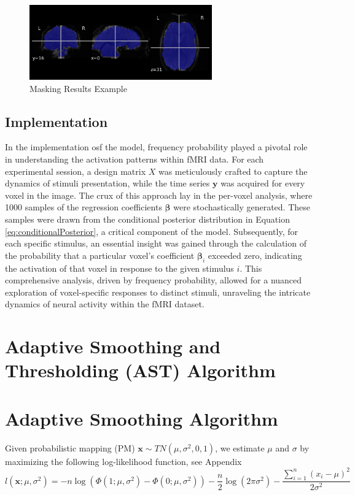 \begin{figure}[htbp!]
\centering
\includegraphics[width=0.7\textwidth]{images/Mask.png}
\caption{Masking Results Example}
\label{fig:c3_Mask}
\end{figure}

\subsection{Implementation}

In the implementation osf the model, frequency probability played a pivotal role in understanding the activation patterns within fMRI data. For each experimental session, a design matrix $X$ was meticulously crafted to capture the dynamics of stimuli presentation, while the time series $\bm{y}$ was acquired for every voxel in the image. The crux of this approach lay in the per-voxel analysis, where 1000 samples of the regression coefficients $\bm{\beta}$ were stochastically generated. These samples were drawn from the conditional posterior distribution in Equation \ref{eq:conditionalPosterior}, a critical component of the model. Subsequently, for each specific stimulus, an essential insight was gained through the calculation of the probability that a particular voxel's coefficient $\bm{\beta}_i$ exceeded zero, indicating the activation of that voxel in response to the given stimulus $i$. This comprehensive analysis, driven by frequency probability, allowed for a nuanced exploration of voxel-specific responses to distinct stimuli, unraveling the intricate dynamics of neural activity within the fMRI dataset.

\section{Adaptive Smoothing and Thresholding (AST) Algorithm}

\section{Adaptive Smoothing Algorithm}

Given probabilistic mapping (PM) $\bm{x} \sim TN(\mu,\sigma^2,0,1)$, we estimate $\mu$ and $\sigma$ by maximizing the following log-likelihood function, see Appendix %
\begin{equation} \label{eq:tn_llf}
l(\bm{x};\mu,\sigma^2) = -n \log \left( \Phi(1;\mu,\sigma^2) - \Phi(0;\mu,\sigma^2) \right)-\frac{n}{2} \log \left( 2\pi \sigma^2 \right) - \frac{\sum_{i=1}^n (x_i-\mu)^2}{2\sigma^2}
\end{equation}

